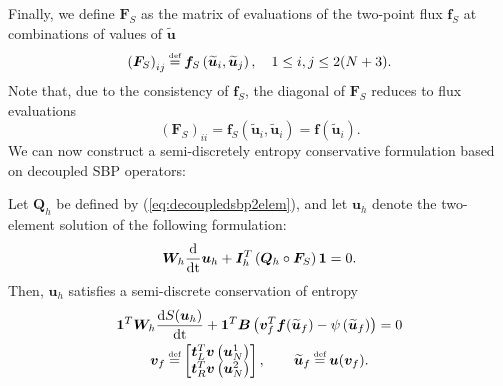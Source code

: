 \documentclass[review,onefignum,onetabnum,final]{siamart171218}
\renewcommand{\tilde}{\widetilde}
\newcommand{\td}[2]{\frac{{\rm d}#1}{{\rm d}{\rm #2}}}
\newcommand{\LRp}[1]{\left( #1 \right)}
\newcommand\myeq{\mathrel{\stackrel{\makebox[0pt]{\mbox{\normalfont\tiny def}}}{=}}}
\begin{document}
Finally, we define $\bm{F}_S$ as the matrix of evaluations of the two-point flux $\bm{f}_S$ at combinations of values of $\tilde{\bm{u}}$
\[
\LRp{\bm{F}_S}_{ij} \myeq \bm{f}_S\LRp{\tilde{\bm{u}}_i,\tilde{\bm{u}}_j}, \quad 1\leq i,j \leq 2(N+3).
\]
Note that, due to the consistency of $\bm{f}_S$, the diagonal of $\bm{F}_S$ reduces to flux evaluations
\begin{equation}
\label{eq:diagFS}
\LRp{\bm{F}_S}_{ii} = \bm{f}_S\LRp{\tilde{\bm{u}}_i,\tilde{\bm{u}}_i} = \bm{f}\LRp{\tilde{\bm{u}}_i}.  
\end{equation}
We can now construct a semi-discretely entropy conservative formulation based on decoupled SBP operators:
\begin{theorem}
\label{thm:consentropy}
Let $\bm{Q}_h$ be defined by (\ref{eq:decoupledsbp2elem}), and let $\bm{u}_h$ denote the two-element solution of the following formulation:
\begin{gather}
\label{eq:form}
\bm{W}_h \td{}{t} \bm{u}_h + \bm{I}_h^T\LRp{\bm{Q}_h \circ \bm{F}_S}\bm{1} = 0.
\end{gather}
Then, $\bm{u}_h$ satisfies a semi-discrete conservation of entropy
\begin{gather*}
\bm{1}^T\bm{W}_h\td{S(\bm{u}_h)}{t} + \bm{1}^T\bm{B}\LRp{\bm{v}_f^T\bm{f}(\tilde{\bm{u}}_f) - \psi\LRp{\tilde{\bm{u}}_f}} = 0\\
\bm{v}_f \myeq \begin{bmatrix}
\bm{t}_L^T \bm{v}\LRp{\bm{u}_N^1}\\
\bm{t}_R^T \bm{v}\LRp{\bm{u}_N^2}
\end{bmatrix}, \qquad \tilde{\bm{u}}_f \myeq \bm{u}(\bm{v}_f).
\end{gather*}
\end{theorem}
\end{document}
